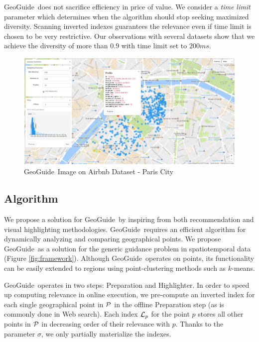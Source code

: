 \documentclass[conference,compsoc]{IEEEtran}
\newcommand{\framework}{{\sc GeoGuide}}
\newcommand{\pb}{{\sc GeoGuide}}
\begin{document}
\framework\ does not sacrifice efficiency in price of value. We consider a {\em time limit} parameter which determines when the algorithm should stop seeking maximized diversity. Scanning inverted indexes guarantees the relevance even if time limit is chosen to be very restrictive. Our observations with several datasets show that we achieve the diversity of more than $0.9$ with time limit set to $200ms$.

\begin{figure}[t]
	\centering
	\includegraphics[width=\textwidth]{figs/airbnb}
	\caption{\framework\ Image on Airbnb Dataset - Paris City}
	\label{fig:airbnb}
	\vspace{-10pt}
\end{figure}

\subsection{Algorithm}
\label{sec:algo}
We propose a solution for \pb\ by inspiring from both recommendation \cite{Omidvar-Tehrani:2015} and
visual highlighting
\cite{Liang2010,Robinson2011}
methodologies. \pb\ requires an efficient algorithm for dynamically analyzing and comparing geographical points. We propose \framework\ as a solution for the generic guidance problem in spatiotemporal data (Figure \ref{fig:framework}). Although \framework\ operates on points, its functionality can be easily extended to regions using point-clustering methods such as $k$-means.

\framework\ operates in two steps: {\sc Preparation} and {\sc Highlighter}. In order to speed up computing relevance in online execution, we pre-compute an inverted index for each single geographical point in ${\cal P}$ in the offline {\sc Preparation} step (as is commonly done in Web search). Each index ${\cal L}_p$ for the point $p$ stores all other points in ${\cal P}$ in decreasing order of their relevance with $p$. Thanks to the parameter $\sigma$, we only partially materialize the indexes.
\end{document}

